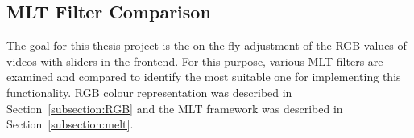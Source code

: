 \documentclass[../MasterThesis.tex]{subfiles}
\begin{document}
%
%
%
%
%
%
%
%
%
%
%
%
%
%
%





\subsection{MLT Filter Comparison} \label{subsection:meltfilter}



The goal for this thesis project is the on-the-fly adjustment of the RGB values of videos with sliders in the frontend. 
For this purpose, various MLT filters are examined and compared to identify the most suitable one for implementing this functionality. 
RGB colour representation was described in Section~\ref{subsection:RGB} and the MLT framework was described in Section~\ref{subsection:melt}.
\end{document}
